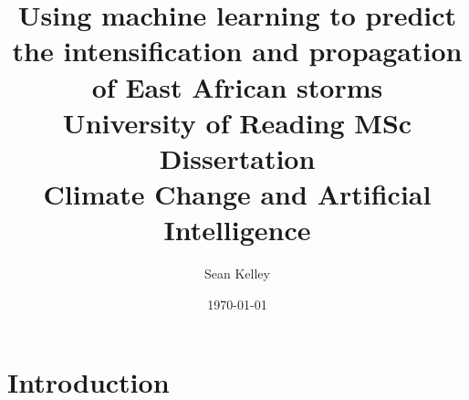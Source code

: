 \documentclass[12pt]{article}
\begin{document}
 
\title{Using machine learning to predict the intensification and propagation of East African storms \\
\large University of Reading MSc Dissertation \\ Climate Change and Artificial Intelligence}
\author{Sean Kelley}
\date{\today}
 
\maketitle

\section*{Introduction}
\cite{Hunt2024}

\newpage

\footnotesize

\end{document}
